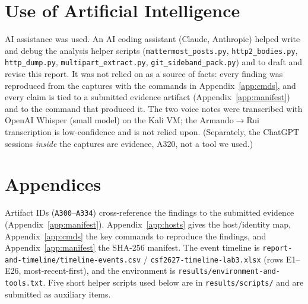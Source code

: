 \documentclass[11pt,a4paper,final,oneside]{article}
\begin{document}
\section{Use of Artificial Intelligence}
\label{sec:ai}

AI assistance was used. An AI coding assistant (Claude, Anthropic) helped write
and debug the analysis helper scripts (\texttt{mattermost\_posts.py},
\texttt{http2\_bodies.py}, \texttt{http\_dump.py}, \texttt{multipart\_extract.py},
\texttt{git\_sideband\_pack.py}) and to draft and revise this report. It was not
relied on as a source of facts: every finding was reproduced from the captures
with the commands in Appendix~\ref{app:cmds}, and every claim is tied to a
submitted evidence artifact (Appendix~\ref{app:manifest}) and to the command that
produced it. The two voice notes were transcribed with OpenAI Whisper (small
model) on the Kali VM; the Armando$\rightarrow$Rui transcription is low-confidence
and is not relied upon. (Separately, the ChatGPT sessions \emph{inside} the
captures are evidence, A320, not a tool we used.)

\section{Appendices}
\label{sec:appendices}

Artifact IDs (\texttt{A300}--\texttt{A334}) cross-reference the findings to the
submitted evidence (Appendix~\ref{app:manifest}). Appendix~\ref{app:hosts} gives
the host/identity map, Appendix~\ref{app:cmds} the key commands to reproduce the
findings, and Appendix~\ref{app:manifest} the SHA-256 manifest. The event
timeline is \texttt{report-and-timeline/timeline-events.csv} /
\texttt{csf2627-timeline-lab3.xlsx} (rows E1--E26, most-recent-first), and the
environment is \texttt{results/environment-and-tools.txt}. Five short helper
scripts used below are in \texttt{results/scripts/} and are submitted as auxiliary
items.

\appendix
\renewcommand{\thesection}{\Alph{section}}
\end{document}
